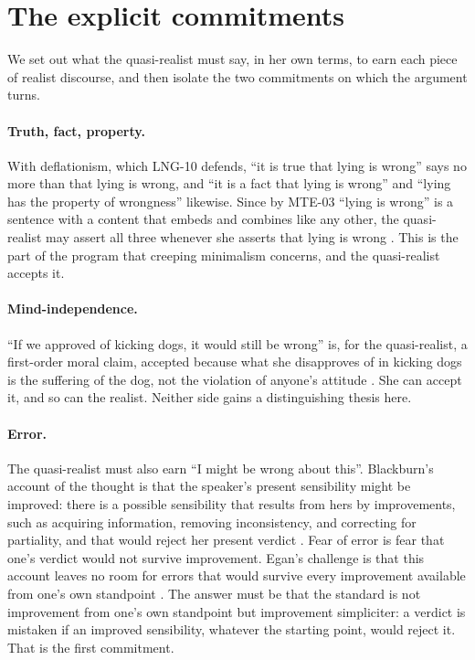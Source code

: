 \documentclass{situationist-preprint}
\begin{document}
\section{The explicit commitments}\label{s:commit}

We set out what the quasi-realist must say, in her own terms, to earn each piece of realist discourse, and then isolate the two commitments on which the argument turns.

\paragraph{Truth, fact, property.} With deflationism, which LNG-10 defends, \enquote{it is true that lying is wrong} says no more than that lying is wrong, and \enquote{it is a fact that lying is wrong} and \enquote{lying has the property of wrongness} likewise. Since by MTE-03 \enquote{lying is wrong} is a sentence with a content that embeds and combines like any other, the quasi-realist may assert all three whenever she asserts that lying is wrong \citep{Blackburn1998}. This is the part of the program that creeping minimalism concerns, and the quasi-realist accepts it.

\paragraph{Mind-independence.} \enquote{If we approved of kicking dogs, it would still be wrong} is, for the quasi-realist, a first-order moral claim, accepted because what she disapproves of in kicking dogs is the suffering of the dog, not the violation of anyone's attitude \citep{Blackburn1984,Blackburn1993}. She can accept it, and so can the realist. Neither side gains a distinguishing thesis here.

\paragraph{Error.} The quasi-realist must also earn \enquote{I might be wrong about this}. Blackburn's account of the thought is that the speaker's present sensibility might be improved: there is a possible sensibility that results from hers by improvements, such as acquiring information, removing inconsistency, and correcting for partiality, and that would reject her present verdict \citep{Blackburn1993,Blackburn1998}. Fear of error is fear that one's verdict would not survive improvement. Egan's challenge is that this account leaves no room for errors that would survive every improvement available from one's own standpoint \citep{Egan2007}. The answer must be that the standard is not improvement from one's own standpoint but improvement simpliciter: a verdict is mistaken if an improved sensibility, whatever the starting point, would reject it. That is the first commitment.
\end{document}
